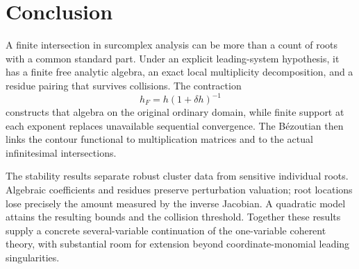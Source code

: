 \documentclass[11pt,letterpaper]{article}
\theoremstyle{definition}
\theoremstyle{remark}
\numberwithin{equation}{section}
\begin{document}
\section{Conclusion}
A finite intersection in surcomplex analysis can be more than a count of roots with a common standard part. Under an explicit leading-system hypothesis, it has a finite free analytic algebra, an exact local multiplicity decomposition, and a residue pairing that survives collisions. The contraction
\[
 h_F=h(1+\delta h)^{-1}
\]
constructs that algebra on the original ordinary domain, while finite support at each exponent replaces unavailable sequential convergence. The B\'ezoutian then links the contour functional to multiplication matrices and to the actual infinitesimal intersections.

The stability results separate robust cluster data from sensitive individual roots. Algebraic coefficients and residues preserve perturbation valuation; root locations lose precisely the amount measured by the inverse Jacobian. A quadratic model attains the resulting bounds and the collision threshold. Together these results supply a concrete several-variable continuation of the one-variable coherent theory, with substantial room for extension beyond coordinate-monomial leading singularities.

\appendix
\end{document}
